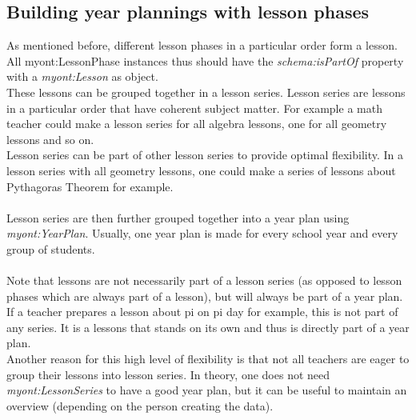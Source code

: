 \documentclass[a4paper]{report}
\begin{document}
    \subsection{Building year plannings with lesson phases}
    \label{subsubsection:hierarchy}
    As mentioned before, different lesson phases in a particular order form a lesson. All myont:LessonPhase instances thus should have the \textit{schema:isPartOf} property with a \textit{myont:Lesson} as object.\\
    These lessons can be grouped together in a lesson series. Lesson series are lessons in a particular order that have coherent subject matter. For example a math teacher could make a lesson series for all algebra lessons, one for all geometry lessons and so on.\\
    Lesson series can be part of other lesson series to provide optimal flexibility. In a lesson series with all geometry lessons, one could make a series of lessons about Pythagoras Theorem for example.\\ \\
    Lesson series are then further grouped together into a year plan using \textit{myont:YearPlan}. Usually, one year plan is made for every school year and every group of students.\\ \\
    Note that lessons are not necessarily part of a lesson series (as opposed to lesson phases which are always part of a lesson), but will always be part of a year plan.\\
    If a teacher prepares a lesson about pi on pi day for example, this is not part of any series. It is a lessons that stands on its own and thus is directly part of a year plan.\\
    Another reason for this high level of flexibility is that not all teachers are eager to group their lessons into lesson series. In theory, one does not need \textit{myont:LessonSeries} to have a good year plan, but it can be useful to maintain an overview (depending on the person creating the data).
\end{document}
